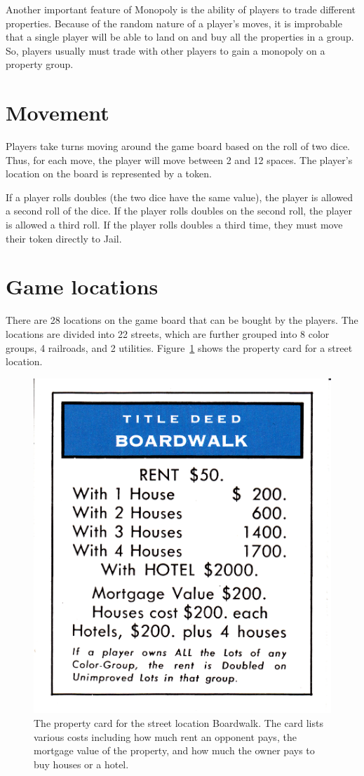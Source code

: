 Another important feature of Monopoly is the ability of players to trade
different properties. Because of the random nature of a player's moves, it is
improbable that a single player will be able to land on and buy all the
properties in a group. So, players usually must trade with other players to gain
a monopoly on a property group. 

\section{Movement}
Players take turns moving around the game board based on the roll of two dice.
Thus, for each move, the player will move between 2 and 12 spaces. The player's
location on the board is represented by a token.

If a player rolls doubles (the two dice have the same value), the player is
allowed a second roll of the dice. If the player rolls doubles on the second
roll, the player is allowed a third roll. If the player rolls doubles a third
time, they must move their token directly to Jail.

\section{Game locations}
There are 28 locations on the game board that can be bought by the players. The
locations are divided into 22 streets, which are further grouped into 8 color
groups, 4 railroads, and 2 utilities. Figure~\ref{figure-street} shows the
property card for a street location.

\begin{figure}[htp]
\centerline{\includegraphics[width=0.5\columnwidth]{Figures/Boardwalk.png}}
\caption[Example property card]{The property card for the street location
Boardwalk. The card lists various costs including how much rent an opponent
pays, the mortgage value of the property, and how much the owner pays to buy
houses or a hotel.}
\label{figure-street}
\end{figure}

